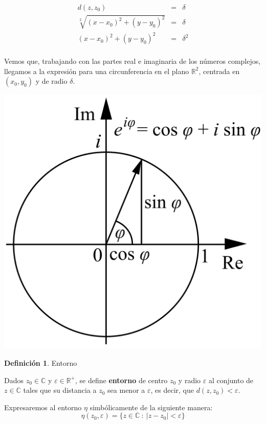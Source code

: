 \documentclass[12pt]{article}
\theoremstyle{definition}
\newtheorem{definition}{Definici\'on}[section]
\begin{document}
\begin{eqnarray*}
d(z, z_0) &=& \delta \\
\sqrt[2]{(x-x_0)^2 + (y-y_0)^2} &=& \delta\\
(x-x_0)^2 + (y-y_0)^2 &=& \delta^2\\
\end{eqnarray*}

Vemos que, trabajando con las partes real e imaginaria de los n\'umeros complejos, llegamos a la expresi\'on para una circunferencia en el plano $\mathbb{R}^2$, centrada en $(x_0, y_0)$ y de radio $\delta$.
\begin{center}
	\includegraphics[scale=0.08]{circulo.png}
\end{center}

\colorbox{red!40!white!80}{\parbox{\linewidth}{
\theoremstyle{definition}
\begin{definition} Entorno

Dados $z_0 \in \mathbb{C}$ y $\varepsilon \in \mathbb{R}^+$, se define \textbf{entorno} de centro $z_0$ y radio $\varepsilon$ al conjunto de $z \in \mathbb{C}$ tales que su distancia a $z_0$ sea menor a $\varepsilon$, es decir, que $d(z, z_0) < \varepsilon$.

Expresaremos al entorno $\eta$ simb\'olicamente de la siguiente manera:
$$ \eta(z_0, \varepsilon) = \{ z \in \mathbb{C}\ :\ |z-z_0|<\varepsilon\} $$
\end{definition}}}
\end{document}
